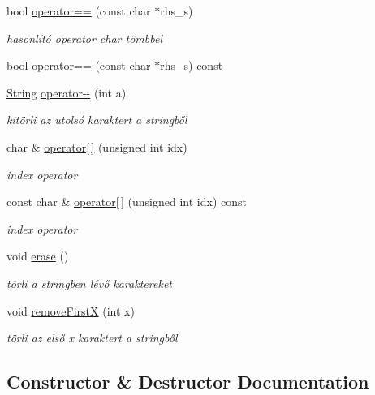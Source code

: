 \begin{DoxyCompactItemize}
bool \mbox{\hyperlink{class_string_ade9af860a809548214837e33367e8835}{operator==}} (const char $\ast$rhs\+\_\+s)
\begin{DoxyCompactList}\small\item\em hasonlító operator char tömbbel \end{DoxyCompactList}\item 
bool \mbox{\hyperlink{class_string_aa50c56cbbbc9956cb359a7617f13809b}{operator==}} (const char $\ast$rhs\+\_\+s) const
\item 
\mbox{\hyperlink{class_string}{String}} \mbox{\hyperlink{class_string_a79869b69dd0106b1b6d179f760d6527a}{operator-\/-\/}} (int a)
\begin{DoxyCompactList}\small\item\em kitörli az utolsó karaktert a stringből \end{DoxyCompactList}\item 
char \& \mbox{\hyperlink{class_string_a1a7c5c39d4dafbbf8516f5058a253f1a}{operator\mbox{[}$\,$\mbox{]}}} (unsigned int idx)
\begin{DoxyCompactList}\small\item\em index operator \end{DoxyCompactList}\item 
const char \& \mbox{\hyperlink{class_string_aaa249e62641872197679cfc7c66118c0}{operator\mbox{[}$\,$\mbox{]}}} (unsigned int idx) const
\begin{DoxyCompactList}\small\item\em index operator \end{DoxyCompactList}\item 
void \mbox{\hyperlink{class_string_a3ce2ea55be9ec912bb2dbc88d461b479}{erase}} ()
\begin{DoxyCompactList}\small\item\em törli a stringben lévő karaktereket \end{DoxyCompactList}\item 
void \mbox{\hyperlink{class_string_a15c07ede44c5bcfb0920e9bf63e75670}{remove\+FirstX}} (int x)
\begin{DoxyCompactList}\small\item\em törli az első x karaktert a stringből \end{DoxyCompactList}\end{DoxyCompactItemize}


\subsection{Constructor \& Destructor Documentation}
\mbox{\label{class_string_a8a7ef356e05eb9b1ea1ab518baee3095}} 
